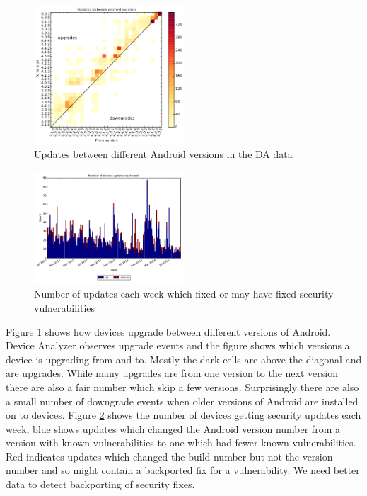 \documentclass[a4paper,twocolumn]{article}
\begin{document}
\begin{figure}
 \includegraphics[width=0.5\textwidth]{figures/from_to_updates.pdf}
 \caption{Updates between different Android versions in the DA data}
 \label{fig:from_to_updates}
\end{figure}
\begin{figure}
 \includegraphics[width=0.5\textwidth]{figures/w_security_updates.pdf}
 \caption{Number of updates each week which fixed or may have fixed security vulnerabilities}
 \label{fig:weekly_security_updates}
\end{figure}
Figure \ref{fig:from_to_updates} shows how devices upgrade between different versions of Android.
Device Analyzer observes upgrade events and the figure shows which versions a device is upgrading from and to.
Mostly the dark cells are above the diagonal and are upgrades.
While many upgrades are from one version to the next version there are also a fair number which skip a few versions.
Surprisingly there are also a small number of downgrade events when older versions of Android are installed on to devices.
Figure \ref{fig:weekly_security_updates} shows the number of devices getting security updates each week, blue shows updates which changed the Android version number from a version with known vulnerabilities to one which had fewer known vulnerabilities.
Red indicates updates which changed the build number but not the version number and so might contain a backported fix for a vulnerability.
We need better data to detect backporting of security fixes.
\end{document}
